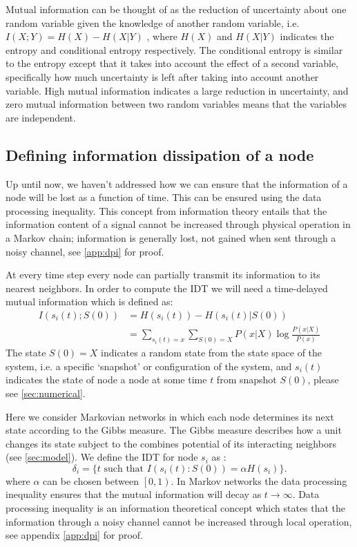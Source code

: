 \documentclass[twoside, twocolumn]{article}
\begin{document}
	Mutual information can be thought of as the reduction of uncertainty about one random variable given the knowledge of another random variable, i.e. $I(X;Y) = H(X) - H(X \vert Y)$ , where $H(X)$ and $H(X\vert Y)$ indicates the entropy and conditional entropy respectively. The conditional entropy is similar to the entropy except that it takes into  account the effect of a second variable, specifically how much uncertainty is left after taking into account another variable. High mutual information indicates a large reduction in uncertainty, and zero mutual information between two random variables means that the variables are independent. 
	
	\subsection{Defining information dissipation of a node}
	Up until now, we haven't addressed how we can ensure that the information of a node will be lost as a function of time. This can be ensured using the data processing inequality. This concept from information theory entails that the information content of a signal cannot be increased through physical operation in a Markov chain; information is generally lost, not gained when sent through a noisy channel, see \ref{app:dpi} for proof.
	
	At every time step every node can partially transmit its information to its nearest neighbors. In order to compute the IDT we will need a time-delayed mutual information which is defined as:
	\begin{equation} \label{eq:mi}
	\begin{aligned}
	I(s_i(t) ; S(0)) &= H(s_i(t)) - H(s_i(t) \vert S(0)) \\
	&= \sum_{s_i(t)=x}  \sum_{S(0) = X} P(x \vert X) \log \frac{P(x \vert X)}{P(x)}
	\end{aligned}
	\end{equation}
	The state $S(0) = X$ indicates a random state from the state space of the system, i.e. a specific `snapshot' or configuration of the system, and $s_i(t)$ indicates the state of node a node at some time $t$ from snapshot $S(0)$, please see \ref{sec:numerical}. 
	
	Here we consider Markovian networks in which each node determines its next state according to the Gibbs measure. The Gibbs measure describes how a unit changes its state subject to the combines potential of its interacting neighbors (see \ref{sec:model}). We define the IDT for node $s_i$ as :
	\begin{equation}
	\delta_i = \{t \textrm{ \ such that \ } I\left( s_i(t) : S(0) \right) = \alpha H\left(s_i \right)\}.
	\end{equation}
	where $\alpha$ can be chosen between $\left[ 0, 1 \right)$. In Markov networks the data processing inequality ensures that the mutual information will decay as $t \rightarrow \infty$. Data processing inequality is an information theoretical concept which states that the information through a noisy channel cannot be increased through local operation, see appendix \ref{app:dpi} for proof.
	
\end{document}
